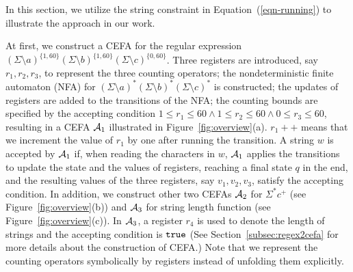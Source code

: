 
In this section, we utilize the string constraint in Equation~(\ref{eqn-running}) to illustrate the approach in our work.

At first, we construct a CEFA for the regular expression $(\Sigma \setminus a)^{\{1, 60\}} (\Sigma \setminus b)^{\{1, 60\}} (\Sigma \setminus c)^{\{0, 60\}}$. Three registers are introduced, say $r_1, r_2, r_3$, to represent the three counting operators;  
the nondeterministic finite automaton (NFA) for $(\Sigma \setminus a)^* (\Sigma \setminus b)^* (\Sigma \setminus c)^*$ is constructed; the updates of registers are added to the transitions of the NFA; the counting bounds are specified by the accepting condition $1 \le r_1 \le 60 \wedge 1 \le r_2 \le 60 \wedge 0 \le r_3 \le 60$, resulting in a CEFA $\mathcal{A}_1$ illustrated in Figure~\ref{fig:overview}(a). $r_1++$ means that we increment the value of $r_1$ by one after running the transition.
A string $w$ is accepted by $\mathcal{A}_1$ if, when reading the characters in $w$, $\mathcal{A}_1$ applies the transitions to update the state and the values of registers, reaching a final state $q$ in the end, and the resulting values of the three registers, say $v_1,v_2,v_3$, satisfy the accepting condition. In addition, we construct other two CEFAs $\mathcal{A}_2$ for $\Sigma^* c^+$ (see Figure~\ref{fig:overview}(b)) and $\mathcal{A}_3$ for string length function (see Figure~\ref{fig:overview}(c)). In $\mathcal{A}_3$, a register $r_4$ is used to denote the length of strings and the accepting condition is $\mathtt{true}$ (See Section~\ref{subsec:regex2cefa} for more details about the construction of CEFA.) Note that we represent the counting operators symbolically by registers instead of unfolding them explicitly. 



